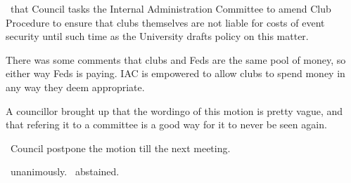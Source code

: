 \begin{motion}
    \birt\ that Council tasks the Internal Administration
    Committee to amend Club Procedure to ensure that clubs themselves are not
    liable for costs of event security until such time as the University drafts
    policy on this matter.
    \movers{\alexander}{\seneca}

    There was some comments that clubs and Feds are the same pool of money, so 
    either way Feds is paying. IAC is empowered to allow clubs to spend money
    in any way they deem appropriate.

    A councillor brought up that the wordingo of this motion is pretty vague, 
    and that refering it to a committee is a good way for it to never be seen 
    again.

    \begin{motion}
        \birt\ Council postpone the motion till the next meeting.
        \movers{\andrewc}{\alexander}

        \carries\ unanimously. \seneca\ abstained. 
    \end{motion}
\end{motion}

